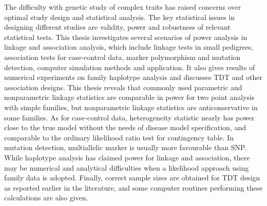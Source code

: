 The difficulty with genetic study of complex traits has raised concerns over
optimal study design and statistical analysis.  The key statistical issues in
designing different studies are validity, power and robustness of relevant
statistical tests.  This thesis investigates several scenarios of power
analysis in linkage and association analysis, which include linkage tests in
small pedigrees, association tests for case-control data, marker polymorphism
and mutation detection, computer simulation methods and application.  It also
gives results of numerical experiments on family haplotype analysis and
discusses TDT and other association designs.  This thesis reveals that commonly
used parametric and nonparametric linkage statistics are comparable in power
for two point analysis with simple families, but nonparametric linkage
statistics are anticonservative in some families.  As for case-control data,
heterogeneity statistic nearly has power close to the true model without the
needs of disease model specification, and comparable to the ordinary likelihood
ratio test for contingency table.  In mutation detection, multiallelic marker
is usually more favourable than SNP.  While haplotype analysis has claimed
power for linkage and association, there may be numerical and analytical
difficulties when a likelihood approach using family data is adopted.  Finally,
correct sample sizes are obtained for TDT design as reported earlier in the
literature, and some computer routines performing these calculations are also
given.
